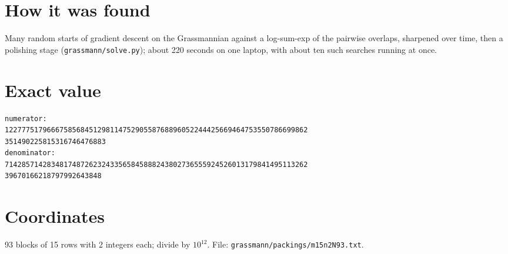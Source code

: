 \documentclass[11pt,a4paper]{article}
\begin{document}
\section{How it was found}
Many random starts of gradient descent on the Grassmannian against a log-sum-exp of the pairwise overlaps, sharpened over time, then a polishing stage (\texttt{grassmann/solve.py}); about 220 seconds on one laptop, with about ten such searches running at once.


\appendix
\section{Exact value}
{\small
\begin{verbatim}
numerator:
122777517966675856845129811475290558768896052244425669464753550786699862
351490225815316746476883
denominator:
714285714283481748726232433565845888243802736555924526013179841495113262
39670166218797992643848
\end{verbatim}}

\section{Coordinates}
93 blocks of 15 rows with 2 integers each; divide by $10^{12}$. File: \texttt{grassmann/packings/m15n2N93.txt}.
{\tiny
\begin{multicols}{4}
\end{multicols}}
\end{document}
